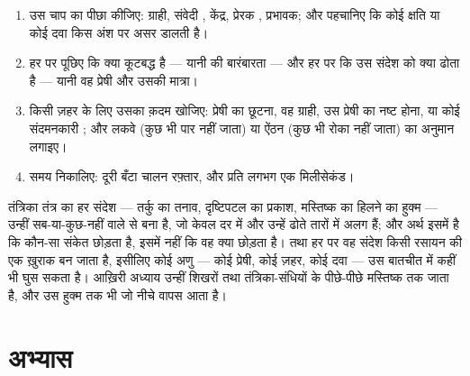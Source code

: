 \begin{method}[किसी प्रतिवर्त या किसी ज़हर का विश्लेषण]\label{met:g12:stretch-reflex:analyse}
\begin{enumerate}
  \item उस चाप का पीछा कीजिए: ग्राही, संवेदी , केंद्र, प्रेरक
        , प्रभावक; और पहचानिए कि कोई क्षति या कोई दवा किस अंश पर
        असर डालती है।
  \item हर  पर पूछिए कि क्या कूटबद्ध है --- यानी  की
        बारंबारता --- और हर  पर कि उस संदेश को क्या ढोता है
        --- यानी वह प्रेषी और उसकी मात्रा।
  \item किसी ज़हर के लिए उसका क़दम खोजिए: प्रेषी का छूटना, वह ग्राही, उस
        प्रेषी का नष्ट होना, या कोई संदमनकारी ; और लकवे (कुछ
        भी पार नहीं जाता) या ऐंठन (कुछ भी रोका नहीं जाता) का अनुमान
        लगाइए।
  \item समय निकालिए: दूरी बँटा चालन रफ़्तार, और प्रति  लगभग एक
        मिलीसेकंड।
\end{enumerate}
\end{method}

\begin{remark}[उन्हीं शिखरों से बना एक संदेश]\label{rem:g12:stretch-reflex:spikes}
तंत्रिका तंत्र का हर संदेश --- तर्कु का तनाव, दृष्टिपटल का प्रकाश,
मस्तिष्क का हिलने का हुक्म --- उन्हीं सब-या-कुछ-नहीं वाले  से
बना है, जो केवल दर में और उन्हें ढोते तारों में अलग हैं; और अर्थ इसमें है कि
कौन-सा  संकेत छोड़ता है, इसमें नहीं कि वह क्या छोड़ता है। तथा हर
 पर वह संदेश किसी रसायन की एक ख़ुराक बन जाता है, इसीलिए कोई अणु
--- कोई प्रेषी, कोई ज़हर, कोई दवा --- उस बातचीत में कहीं भी घुस सकता है।
आख़िरी अध्याय उन्हीं शिखरों तथा तंत्रिका-संधियों के पीछे-पीछे मस्तिष्क तक
जाता है, और उस हुक्म तक भी जो नीचे वापस आता है।
\end{remark}

\section{अभ्यास}

